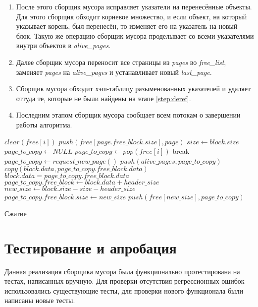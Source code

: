 \begin{enumerate}
\item После этого сборщик мусора исправляет указатели на перенесённые объекты. Для этого сборщик обходит корневое множество, и если объект, на который указывает корень, был перенесён, то изменяет его на указатель на новый блок. Такую же операцию сборщик мусора проделывает со всеми указателями внутри объектов в \textit{alive\_pages}.
\item Далее сборщик мусора переносит все страницы из \textit{pages} во \textit{free\_list}, заменяет \textit{pages} на \textit{alive\_pages} и устанавливает новый \textit{last\_page}.
\item Сборщик мусора обходит хэш-таблицу разыменованных указателей и удаляет оттуда те, которые не были найдены на этапе \ref{step:deref}.
\item Последним этапом сборщик мусора сообщает всем потокам о завершении работы алгоритма. 
\end{enumerate}

\begin{algorithm}
\begin{algorithmic}[1]
    \State $clear(free[i])$
\EndFor
{}
    \State $push(free[page.free\_block.size], page)$
\EndFor
{}
            \State $size \gets block.size$
            \State $page\_to\_copy \gets NULL$
                    \State $page\_to\_copy \gets pop(free[i])$
                    \State break
                \EndIf
            \EndFor
                \State $page\_to\_copy \gets request\_new\_page()$
                \State $push(alive\_pages, page\_to\_copy)$
            \EndIf
            \State $copy(block.data, page\_to\_copy.free\_block.data)$
            \State $block.data = page\_to\_copy.free\_block.data$
            \State $page\_to\_copy.free\_block \gets block.data + header\_size$
            \State $new\_size \gets block.size - size - header\_size$
            \State $page\_to\_copy.free\_block.size \gets new\_size$
            \State $push(free[new\_size], page\_to\_copy)$
        \EndIf
    \EndFor
\EndFor

\end{algorithmic}
\caption{Сжатие}\label{alg:copy}
\end{algorithm}

\section{Тестирование и апробация}
Данная реализация сборщика мусора была функционально протестирована на тестах, написанных вручную. Для проверки отсутствия регрессионных ошибок использовались существующие тесты, для проверки нового функционала были написаны новые тесты.

